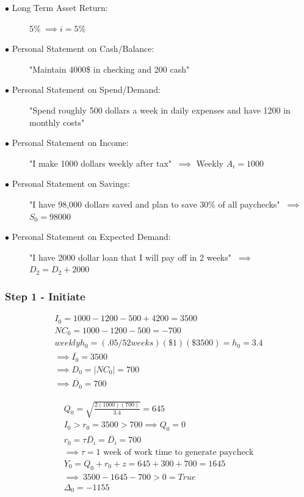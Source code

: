 \documentclass{article}
\begin{document}
\begin{description}
	\item[$\bullet$ Long Term Asset Return:] $5\% \: \implies i = 5\%$
	\item[$\bullet$ Personal Statement on Cash/Balance:] "Maintain 4000\$ in checking and 200 cash"
	\item[$\bullet$ Personal Statement on Spend/Demand:] "Spend roughly 500 dollars a week in daily expenses and have 1200 in monthly costs"
	\item[$\bullet$ Personal Statement on Income:] "I make 1000 dollars weekly after tax" $\: \implies$ Weekly $A_{i} =  1000 $
	\item[$\bullet$ Personal Statement on Savings:] "I have 98,000 dollars saved and plan to save 30\% of all paychecks" $\: \implies$ \: $S_{0} =  98000 $
	\subitem[$\implies \: z =  1000*.3 = 300 $]
	\item[$\bullet$ Personal Statement on Expected Demand:] "I have 2000 dollar loan that I will pay off in 2 weeks" $\: \implies$ \: $D_{2} =  D_{2} + 2000 $
\end{description}

\subsubsection{Step 1 - Initiate}

\begin{equation}
	\begin{split}
		I_{0} = 1000 - 1200 -500 + 4200 = 3500\\
		NC_{0} = 1000 - 1200 - 500 = -700\\
		weekly h_{0} = (.05/52 weeks)(\$1)(\$3500) = h_{0} = 3.4 \\
		\implies \overline{I_{0}} =  3500 \\
		\implies D_{0} = |NC_{0}|  = 700 \\
		\implies \overline{D_{0}} = 700 
	\end{split}
\end{equation}
\FloatBarrier

\begin{equation}
	\begin{split}
		Q_{0} =  \sqrt{\frac{2(1000)(700)}{3.4}} = 645\\
		I_{0} > r_{0} =3500 > 700 \implies Q_{0} = 0\\
		r_{0} =  \tau\overline{D_{i}} = \overline{D_{i}} = 700\\
		\implies \tau = \text{1 week of work time to generate paycheck}\\
		Y_{0} = Q_{0} + r_{0} + z = 645 + 300 + 700 = 1645\\
		\implies \: 3500 - 1645 - 700 > 0  = True \\
		\Delta_{0} = -1155
	\end{split}
\end{equation}
\FloatBarrier
\end{document}
